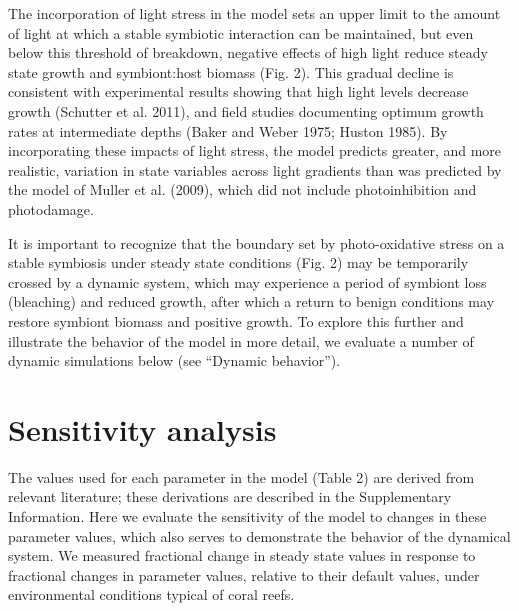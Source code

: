 \documentclass[]{elsarticle} %
\begin{document}
The incorporation of light stress in the model sets an upper limit to
the amount of light at which a stable symbiotic interaction can be
maintained, but even below this threshold of breakdown, negative effects
of high light reduce steady state growth and symbiont:host biomass (Fig.
2). This gradual decline is consistent with experimental results showing
that high light levels decrease growth (Schutter et al. 2011), and field
studies documenting optimum growth rates at intermediate depths (Baker
and Weber 1975; Huston 1985). By incorporating these impacts of light
stress, the model predicts greater, and more realistic, variation in
state variables across light gradients than was predicted by the model
of Muller et al. (2009), which did not include photoinhibition and
photodamage.

It is important to recognize that the boundary set by photo-oxidative
stress on a stable symbiosis under steady state conditions (Fig. 2) may
be temporarily crossed by a dynamic system, which may experience a
period of symbiont loss (bleaching) and reduced growth, after which a
return to benign conditions may restore symbiont biomass and positive
growth. To explore this further and illustrate the behavior of the model
in more detail, we evaluate a number of dynamic simulations below (see
``Dynamic behavior'').

\section{Sensitivity analysis}\label{sensitivity-analysis}

The values used for each parameter in the model (Table 2) are derived
from relevant literature; these derivations are described in the
Supplementary Information. Here we evaluate the sensitivity of the model
to changes in these parameter values, which also serves to demonstrate
the behavior of the dynamical system. We measured fractional change in
steady state values in response to fractional changes in parameter
values, relative to their default values, under environmental conditions
typical of coral reefs.
\end{document}
